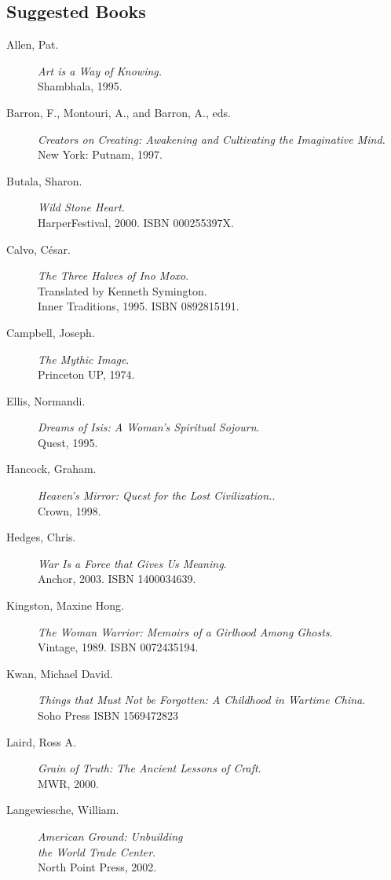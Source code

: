 \documentclass[letterpaper,10pt,headsepline]{scrreprt}
\begin{document}
\subsection{Suggested Books}
\begin{description}
\item [Allen, Pat.] \textit{Art is a Way of Knowing.} \\Shambhala, 1995.
\item [Barron, F., Montouri, A., and Barron, A., eds.] \textit{Creators on Creating: Awakening and Cultivating the Imaginative Mind.} 
\\New York: Putnam, 1997.
\item [Butala, Sharon.] \textit{Wild Stone Heart}. \\HarperFestival,
  2000. \textsc{ISBN 000255397X}.
\item [Calvo, C\'esar.] \textit{The Three Halves of Ino Moxo}.
  \\Translated by Kenneth Symington. \\Inner Traditions, 1995.
  \textsc{ISBN 0892815191}.
\item [Campbell, Joseph.] \textit{The Mythic Image}.
  \\Princeton UP, 1974.
\item [Ellis, Normandi.] \textit{Dreams of Isis: A Woman's Spiritual
    Sojourn}.
  \\Quest, 1995.
\item [Hancock, Graham.] \textit{Heaven's Mirror: Quest for the Lost
    Civilization.}.
  \\Crown, 1998.
\item [Hedges, Chris.] \textit{War Is a Force that Gives Us Meaning}.
  \\Anchor, 2003. \textsc{ISBN 1400034639}.
\item [Kingston, Maxine Hong.] \textit{The Woman Warrior: Memoirs of a
    Girlhood Among Ghosts}. \\Vintage, 1989. \textsc{ISBN
    0072435194}.
\item [Kwan, Michael David.] \textit{Things that Must Not be
    Forgotten: A Childhood in Wartime China}. \\Soho Press
  \textsc{ISBN 1569472823}
\item [Laird, Ross A.] \textit{Grain of Truth: The Ancient Lessons of Craft}. \\MWR, 2000.
\item [Langewiesche, William.] \textit{American Ground: Unbuilding
    \\the World Trade Center}. \\North Point Press, 2002.

\end{description}
\end{document}
